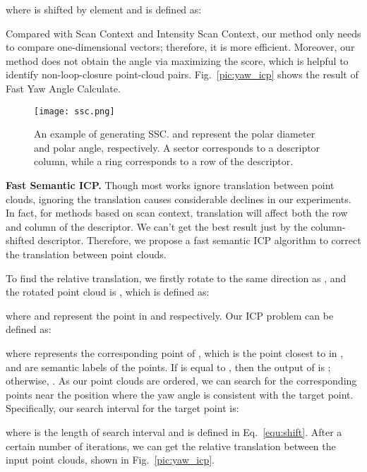 \documentclass[letterpaper, 10 pt, conference]{ieeeconf}
\begin{document}
where  is  shifted by  element and  is defined as:


Compared with Scan Context and Intensity Scan Context, our method only needs to compare one-dimensional vectors; therefore, it is more efficient. Moreover, our method does not obtain the angle via maximizing the score, which is helpful to identify non-loop-closure point-cloud pairs. Fig.~\ref{pic:yaw_icp} shows the result of Fast Yaw Angle Calculate.

\begin{figure}[t]
    \centering
\texttt{[image: ssc.png]}\vspace{-2mm}
\caption{An example of generating SSC.  and  represent the polar diameter and polar angle, respectively. A sector corresponds to a descriptor column, while a ring corresponds to a row of the descriptor.}
    \label{pic:ssc}
 \end{figure}

\textbf{Fast Semantic ICP.}\label{ssc:icp}
Though most works ignore translation between point clouds, ignoring the translation causes considerable declines in our experiments. In fact, for methods based on scan context, translation will affect both the row and column of the descriptor. We can’t get the best result just by the column-shifted descriptor. Therefore, we propose a fast semantic ICP algorithm to correct the translation between point clouds.



To find the relative translation, we firstly rotate  to the same direction as , and the rotated point cloud is , which is defined as:
 
where  and  represent the  point in  and  respectively. Our ICP problem can be defined as:
 
 where  represents the corresponding point of , which is the point closest to  in ,  and  are semantic labels of the points. If  is equal to , then the output of  is ; otherwise, . As our point clouds are ordered, we can search for the corresponding points near the position where the yaw angle is consistent with the target point. Specifically, our search interval for the  target point is:
 
 where  is the length of search interval and  is defined in Eq.~\ref{equ:shift}. After a certain number of iterations, we can get the relative translation between the input point clouds, shown in Fig.~\ref{pic:yaw_icp}.
\end{document}
